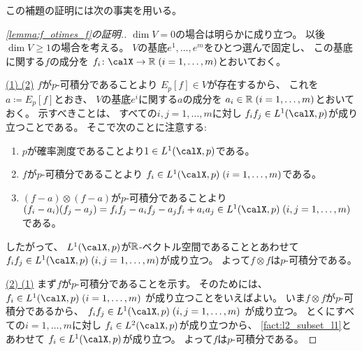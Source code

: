\documentclass[report]{jlreq}
\begin{document}
この補題の証明には次の事実を用いる。


\begin{proof}[\cref{lemma:f_otimes_f}の証明.]
    $\dim V = 0$の場合は明らかに成り立つ。
    以後$\dim V \ge 1$の場合を考える。
    $V$の基底$e^1, \dots, e^m$をひとつ選んで固定し、
    この基底に関する$f$の成分を
    $f_i \colon \calX \to \R \; (i = 1, \dots, m)$とおいておく。

    \uline{(1) \Rightarrow (2)} \quad
    $f$が$p$-可積分であることより
    $E_p[f] \in V$が存在するから、
    これを$a \coloneqq E_p[f]$とおき、
    $V$の基底$e^i$に関する$a$の成分を
    $a_i \in \mathbb{R} \; (i = 1, \dots, m)$とおいておく。
    示すべきことは、
    すべての$i, j = 1, \dots, m$に対し
    $f_i f_j \in L^1(\calX, p)$が成り立つことである。
    そこで次のことに注意する:
    \begin{enumerate}[label=(\roman*)]
        \item $p$が確率測度であることより$1 \in L^1(\calX, p)$である。
        \item $f$が$p$-可積分であることより
            $f_i \in L^1(\calX, p) \; (i = 1, \dots, m)$である。
        \item $(f - a) \otimes (f - a)$が$p$-可積分であることより
            $(f_i - a_i)(f_j - a_j)
                = f_i f_j - a_i f_j - a_j f_i + a_i a_j \in L^1(\calX, p) \;
                (i, j = 1, \dots, m)$である。
    \end{enumerate}
    したがって、
    $L^1(\calX, p)$が$\mathbb{R}$-ベクトル空間であることとあわせて
    $f_i f_j \in L^1(\calX, p) \; (i, j = 1, \dots, m)$が成り立つ。
    よって$f \otimes f$は$p$-可積分である。

    \uline{(2) \Rightarrow (1)} \quad
    まず$f$が$p$-可積分であることを示す。
    そのためには、
    $f_i \in L^1(\calX, p) \; (i = 1, \dots, m)$
    が成り立つことをいえばよい。
    いま$f \otimes f$が$p$-可積分であるから、
    $f_i f_j \in L^1(\calX, p) \; (i, j = 1, \dots, m)$
    が成り立つ。
    とくにすべての$i = 1, \dots, m$に対し
    $f_i \in L^2(\calX, p)$が成り立つから、
    \cref{fact:l2_subset_l1}とあわせて
    $f_i \in L^1(\calX, p)$が成り立つ。
    よって$f$は$p$-可積分である。


\end{proof}
\end{document}
